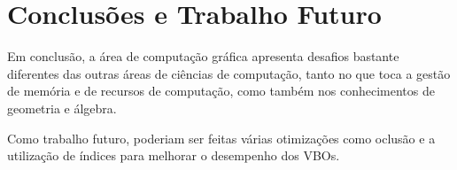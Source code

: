 \documentclass[a4paper]{article}
\begin{document}
\section{Conclusões e Trabalho Futuro}

Em conclusão, a área de computação gráfica apresenta desafios bastante
diferentes das outras áreas de ciências de computação, tanto no que toca a
gestão de memória e de recursos de computação, como também nos conhecimentos de
geometria e álgebra.

Como trabalho futuro, poderiam ser feitas várias otimizações como oclusão e a
utilização de índices para melhorar o desempenho dos VBOs.
\end{document}
